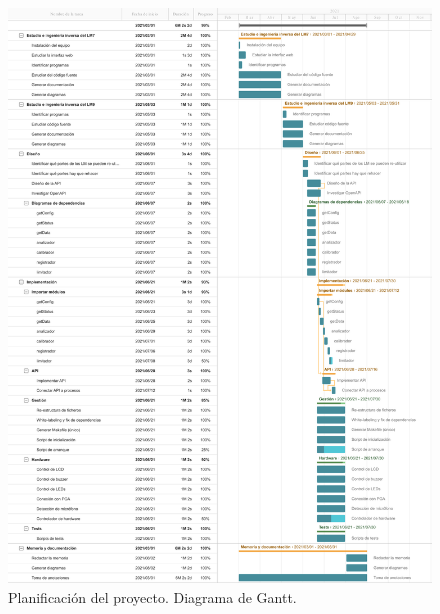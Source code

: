 \begin{figure}[h]
    \centering
    \includegraphics[width=1\textwidth]{figuras/gantt.pdf}
    \caption{Planificación del proyecto. Diagrama de Gantt.}
    \label{fig:gantt}
\end{figure}

